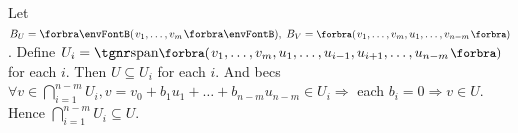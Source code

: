 Let $B_U=\Par{v_1,\dots,v_m},\;B_V=\BigPar{v_1,\dots,v_m,u_1,\dots,v_{n-m}}$.\parSol{}
Define $U_i=\Span[\BigPar]{v_1,\dots,v_m,u_1,\dots,u_{i-1},u_{i+1},\dots,u_{n-m}}$ for each $i$. Then $U\subseteq U_i$ for each $i.$\vspace{4pt}\parSol{}
And becs $\forall v\in \bigcap\limits_{i=1}^{n-m}U_i,v=v_0+b_1 u_1+\dots+b_{n-m} u_{n-m}\in U_i\Rightarrow$ each $b_i=0\Rightarrow v\in U.$\vspace{-4pt}\parSol{}
Hence $\bigcap\limits_{i=1}^{n-m}U_i\subseteq U.$\PfEnd
\SepLine

